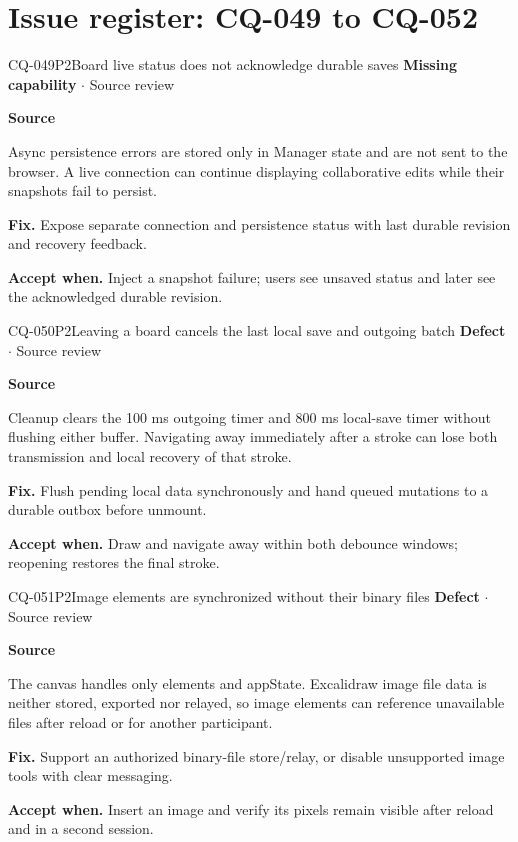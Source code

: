 \section*{Issue register: CQ-049 to CQ-052}
\begin{finding}{CQ-049}{P2}{Board live status does not acknowledge durable saves}
\textbf{Missing capability} $\cdot$ Source review\par
\textbf{Source}\quad{}\par
Async persistence errors are stored only in Manager state and are not sent to the browser. A live connection can continue displaying collaborative edits while their snapshots fail to persist.\par
\textbf{Fix.} Expose separate connection and persistence status with last durable revision and recovery feedback.\par
\textbf{Accept when.} Inject a snapshot failure; users see unsaved status and later see the acknowledged durable revision.
\end{finding}
\begin{finding}{CQ-050}{P2}{Leaving a board cancels the last local save and outgoing batch}
\textbf{Defect} $\cdot$ Source review\par
\textbf{Source}\quad{}\par
Cleanup clears the 100 ms outgoing timer and 800 ms local-save timer without flushing either buffer. Navigating away immediately after a stroke can lose both transmission and local recovery of that stroke.\par
\textbf{Fix.} Flush pending local data synchronously and hand queued mutations to a durable outbox before unmount.\par
\textbf{Accept when.} Draw and navigate away within both debounce windows; reopening restores the final stroke.
\end{finding}
\begin{finding}{CQ-051}{P2}{Image elements are synchronized without their binary files}
\textbf{Defect} $\cdot$ Source review\par
\textbf{Source}\quad{}\par
The canvas handles only elements and appState. Excalidraw image file data is neither stored, exported nor relayed, so image elements can reference unavailable files after reload or for another participant.\par
\textbf{Fix.} Support an authorized binary-file store/relay, or disable unsupported image tools with clear messaging.\par
\textbf{Accept when.} Insert an image and verify its pixels remain visible after reload and in a second session.
\end{finding}
